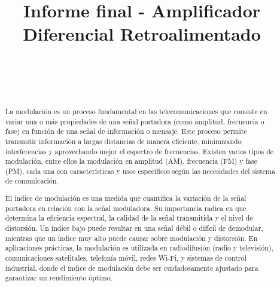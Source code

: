 \documentclass[conference]{IEEEtran}
\begin{document}
	
	\title{Informe final - Amplificador Diferencial Retroalimentado}
	\author{
		\\
		\\
		\\
		\and
		\centering
		\and
	}
	
	\maketitle
	\begin{abstract}
		La modulación es un proceso fundamental en las telecomunicaciones que consiste en variar una o más propiedades de una señal portadora (como amplitud, frecuencia o fase) en función de una señal de información o mensaje. Este proceso permite transmitir información a largas distancias de manera eficiente, minimizando interferencias y aprovechando mejor el espectro de frecuencias. Existen varios tipos de modulación, entre ellos la modulación en amplitud (AM), frecuencia (FM) y fase (PM), cada una con características y usos específicos según las necesidades del sistema de comunicación.
		
		El índice de modulación es una medida que cuantifica la variación de la señal portadora en relación con la señal moduladora. Su importancia radica en que determina la eficiencia espectral, la calidad de la señal transmitida y el nivel de distorsión. Un índice bajo puede resultar en una señal débil o difícil de demodular, mientras que un índice muy alto puede causar sobre modulación y distorsión. En aplicaciones prácticas, la modulación es utilizada en radiodifusión (radio y televisión), comunicaciones satelitales, telefonía móvil, redes Wi-Fi, y sistemas de control industrial, donde el índice de modulación debe ser cuidadosamente ajustado para garantizar un rendimiento óptimo.
	\end{abstract}
	
\end{document}
